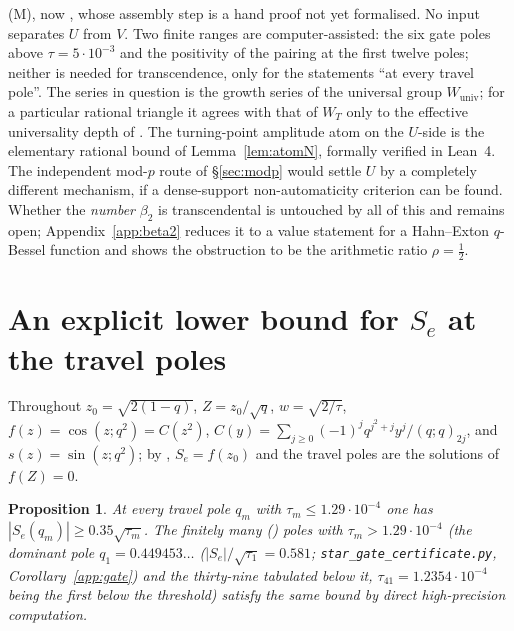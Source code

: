\documentclass[11pt]{article}
\theoremstyle{plain}
\newtheorem{proposition}[theorem]{Proposition}
\theoremstyle{definition}
\theoremstyle{remark}
\begin{document}
\textup{(M)}, now {\cite[Theorem ``the transfer model \textup{(M)}'', \textup{thm:model}]{Bonfioli2026bA}}, whose assembly step is a hand proof not yet formalised.
No input separates $U$ from $V$. Two finite ranges are computer-assisted: the six gate poles above
$\tau=5\cdot10^{-3}$ and the positivity of the pairing at the first twelve poles; neither is
needed for transcendence, only for the statements ``at every travel pole''. The series in question
is the growth series of the universal group $W_{\mathrm{univ}}$; for a particular rational triangle
it agrees with that of $W_T$ only to the effective universality depth of \cite{Bonfioli2026a}.
The turning-point amplitude atom on the $U$-side is the elementary rational bound
of Lemma~\ref{lem:atomN}, formally verified in Lean~4. The independent mod-$p$ route of
\S\ref{sec:modp} would settle $U$ by a completely different mechanism, if a dense-support
non-automaticity criterion can be found. Whether the \emph{number} $\beta_2$ is transcendental is
untouched by all of this and remains open; Appendix~\ref{app:beta2} reduces it to a value statement
for a Hahn--Exton $q$-Bessel function and shows the obstruction to be the arithmetic ratio
$\rho=\tfrac12$.

\appendix
\section{An explicit lower bound for $S_e$ at the travel poles}\label{app:annulus}

Throughout $z_0=\sqrt{2(1-q)}$, $Z=z_0/\sqrt q$, $w=\sqrt{2/\tau}$, $f(z)=\cos(z;q^2)=C(z^2)$,
$C(y)=\sum_{j\ge0}(-1)^jq^{j^2+j}y^j/(q;q)_{2j}$, and $s(z)=\sin(z;q^2)$; by
{\cite[Proposition \textup{prop:qtrig}]{Bonfioli2026bA}}, $S_e=f(z_0)$ and the travel poles are the solutions of $f(Z)=0$.

\begin{proposition}\label{prop:selower}
At every travel pole $q_m$ with $\tau_m\le1.29\cdot10^{-4}$ one has
$|S_e(q_m)|\ge0.35\sqrt{\tau_m}$. The finitely many ({\cite[Lemma ``The travel poles are locally finite'', \textup{lem:polefinite}]{Bonfioli2026bA}}) poles with
$\tau_m>1.29\cdot10^{-4}$ (the
dominant pole $q_1=0.449453\ldots$ ($|S_e|/\sqrt{\tau_1}=0.581$;
\texttt{star\_gate\_certificate.py}, Corollary~\ref{app:gate}) and the thirty-nine tabulated below
it, $\tau_{41}=1.2354\cdot10^{-4}$ being the first below the threshold) satisfy the same bound
by direct high-precision computation.
\end{proposition}
\end{document}
